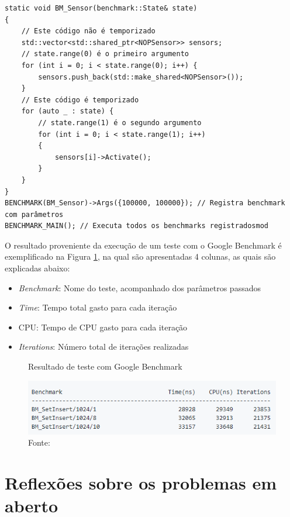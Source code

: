 \begin{lstlisting}[caption = {Caso de teste com Google Benchmark}, float=htb,
source = {Adaptado de \citeonline{google_test_primer}}, label = {cod:google_bench}]
static void BM_Sensor(benchmark::State& state)
{
    // Este código não é temporizado
    std::vector<std::shared_ptr<NOPSensor>> sensors;
    // state.range(0) é o primeiro argumento
    for (int i = 0; i < state.range(0); i++) {
        sensors.push_back(std::make_shared<NOPSensor>());
    }
    // Este código é temporizado
    for (auto _ : state) {
        // state.range(1) é o segundo argumento
        for (int i = 0; i < state.range(1); i++)
        {
            sensors[i]->Activate();
        }
    }
}
BENCHMARK(BM_Sensor)->Args({100000, 100000}); // Registra benchmark com parâmetros
BENCHMARK_MAIN(); // Executa todos os benchmarks registradosmod
\end{lstlisting}

O resultado proveniente da execução de um teste com o Google Benchmark é
exemplificado na Figura \ref{fig:google_bench_result}, na qual são apresentadas
4 colunas, as quais são explicadas abaixo:

\begin{itemize}
  \item \textit{Benchmark}: Nome do teste, acompanhado dos parâmetros passados
  \item \textit{Time}: Tempo total gasto para cada iteração
  \item CPU: Tempo de CPU gasto para cada iteração
  \item \textit{Iterations}: Número total de iterações realizadas
\end{itemize}

\begin{figure}[!htb]
  \centering
  \caption{Resultado de teste com Google Benchmark}
  \includegraphics[width=.8\textwidth]{../figures/google_bench_result.png}
  \caption*{Fonte: }
  \label{fig:google_bench_result}
\end{figure}

\FloatBarrier

\section{Reflexões sobre os problemas em aberto}\label{sec:problemas}

